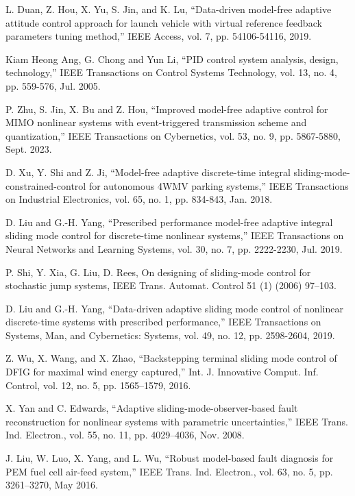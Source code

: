 \documentclass[journal,onecolumn]{IEEEtran}
\begin{document}
\begin{thebibliography}{99}
    L. Duan, Z. Hou, X. Yu, S. Jin, and K. Lu, “Data-driven model-free adaptive attitude control approach for launch vehicle with virtual reference feedback parameters tuning method,” IEEE Access, vol. 7, pp. 54106-54116, 2019.

    Kiam Heong Ang, G. Chong and Yun Li, “PID control system analysis, design, technology,” IEEE Transactions on Control Systems Technology, vol. 13, no. 4, pp. 559-576, Jul. 2005.
    
    P. Zhu, S. Jin, X. Bu and Z. Hou, “Improved model-free adaptive control for MIMO nonlinear systems with event-triggered transmission scheme and quantization,” IEEE Transactions on Cybernetics, vol. 53, no. 9, pp. 5867-5880, Sept. 2023.
    
    D. Xu, Y. Shi and Z. Ji, “Model-free adaptive discrete-time integral
    sliding-mode-constrained-control for autonomous 4WMV parking systems,” IEEE Transactions on Industrial Electronics, vol. 65, no. 1, pp.
    834-843, Jan. 2018.
    
    D. Liu and G.-H. Yang, “Prescribed performance model-free adaptive integral sliding mode control for discrete-time nonlinear systems,” IEEE Transactions on Neural Networks and Learning Systems, vol. 30, no. 7, pp. 2222-2230, Jul. 2019.
    
    P. Shi, Y. Xia, G. Liu, D. Rees, On designing of sliding-mode control for stochastic jump systems, IEEE Trans. Automat. Control 51 (1) (2006) 97–103.
    
    D. Liu and G.-H. Yang, “Data-driven adaptive sliding mode control of nonlinear discrete-time systems with prescribed performance,” IEEE Transactions on Systems, Man, and Cybernetics: Systems, vol. 49, no. 12, pp. 2598-2604, 2019.
    
    Z. Wu, X. Wang, and X. Zhao, “Backstepping terminal sliding mode
    control of DFIG for maximal wind energy captured,” Int. J. Innovative
    Comput. Inf. Control, vol. 12, no. 5, pp. 1565–1579, 2016.

    X. Yan and C. Edwards, “Adaptive sliding-mode-observer-based fault
    reconstruction for nonlinear systems with parametric uncertainties,” IEEE
    Trans. Ind. Electron., vol. 55, no. 11, pp. 4029–4036, Nov. 2008.

    J. Liu, W. Luo, X. Yang, and L. Wu, “Robust model-based fault diagnosis
    for PEM fuel cell air-feed system,” IEEE Trans. Ind. Electron., vol. 63,
    no. 5, pp. 3261–3270, May 2016.


\end{thebibliography}
\end{document}
